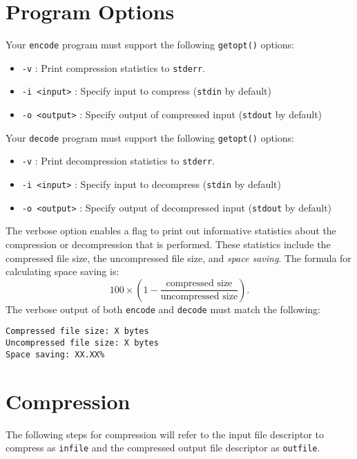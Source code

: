 \documentclass{article}
\begin{document}
\section{Program Options}

Your \texttt{encode} program must support the following \texttt{getopt()}
options:

\begin{itemize}
    \item \texttt{-v} : Print compression statistics to \texttt{stderr}.

    \item \texttt{-i <input>} : Specify input to compress (\texttt{stdin} by
        default)

    \item \texttt{-o <output>} : Specify output of compressed input
        (\texttt{stdout} by default)
\end{itemize}

Your \texttt{decode} program must support the following \texttt{getopt()}
options:

\begin{itemize}
    \item \texttt{-v} : Print decompression statistics to
      \texttt{stderr}.

    \item \texttt{-i <input>} : Specify input to decompress (\texttt{stdin} by
        default)

    \item \texttt{-o <output>} : Specify output of decompressed input
        (\texttt{stdout} by default)
\end{itemize}

The verbose option enables a flag to print out informative statistics about the
compression or decompression that is performed. These statistics include the
compressed file size, the uncompressed file size, and \emph{space
saving}.
The formula for calculating space saving is:
\[
  100\times\left ( 1-\frac{\text{compressed size}} {\text{uncompressed size}} \right).
\]
The verbose output of both \texttt{encode} and
\texttt{decode} must match the following:

\begin{verbatim}
Compressed file size: X bytes
Uncompressed file size: X bytes
Space saving: XX.XX%
\end{verbatim}

\section{Compression}
The following steps for compression will refer to the input file descriptor to
compress as \texttt{infile} and the compressed output file descriptor as
\texttt{outfile}.
\end{document}
